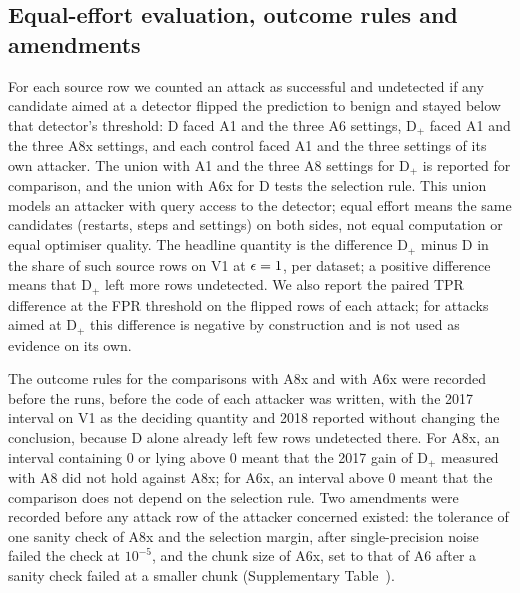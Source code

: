 \subsection*{Equal-effort evaluation, outcome rules and amendments}
\label{sec:protocol}
For each source row we counted an attack as successful and undetected if any candidate aimed at a detector flipped the
prediction to benign and stayed below that detector's threshold: D faced A1 and the three A6 settings, D$_+$ faced A1
and the three A8x settings, and each control faced A1 and the three settings of its own attacker.
The union with A1 and the three A8 settings for D$_+$ is reported for comparison, and the union with A6x for D tests
the selection rule.
This union models an attacker with query access to the detector; equal effort means the same candidates (restarts,
steps and settings) on both sides, not equal computation or equal optimiser quality.
The headline quantity is the difference D$_+$ minus D in the share of such source rows on V1 at
$\epsilon = 1$, per dataset; a positive difference means that D$_+$ left more rows undetected.
We also report the paired TPR difference at the \paramFPR{} FPR threshold on the flipped rows of each attack; for
attacks aimed at D$_+$ this difference is negative by construction and is not used as evidence on its own.

The outcome rules for the comparisons with A8x and with A6x were recorded before the runs, before the code of each
attacker was written, with the 2017 interval on V1 as the deciding quantity and 2018 reported without changing the
conclusion, because D alone already left few rows undetected there.
For A8x, an interval containing $0$ or lying above $0$ meant that the 2017 gain of D$_+$ measured with A8 did not hold
against A8x; for A6x, an interval above $0$ meant that the comparison does not depend on the selection rule.
Two amendments were recorded before any attack row of the attacker concerned existed: the tolerance of one sanity check
of A8x and the \axMargin{} selection margin, after single-precision noise failed the check at $10^{-5}$, and the chunk
size of A6x, set to that of A6 after a sanity check failed at a smaller chunk (Supplementary Table~\suppTabRuns).


